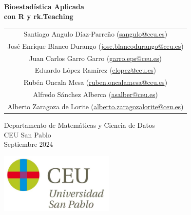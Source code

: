 \begin{titlepage}
\thispagestyle{empty}
\vspace*{7cm}
\par

\begin{center}
\normalfont\fontsize{30}{30}\selectfont
{\bfseries \color{blueceu}Bioestadística Aplicada\\ con R y rk.Teaching}
\end{center}
\vspace{1cm}

\begin{center}
\Large
\begin{tabular}{c}
Santiago Angulo Díaz-Parreño (\url{sangulo@ceu.es})\\
José Enrique Blanco Durango (\url{jose.blancodurango@ceu.es})\\
Juan Carlos Garro Garro (\url{garro.eps@ceu.es})\\
Eduardo López Ramírez (\url{elopez@ceu.es})\\
Rubén Oncala Mesa (\url{ruben.oncalamesa@ceu.es})\\
Alfredo Sánchez Alberca (\url{asalber@ceu.es})\\
Alberto Zaragoza de Lorite (\url{alberto.zaragozalorite@ceu.es})    
\end{tabular}

\medskip 
Departamento de Matemáticas y Ciencia de Datos\\ CEU San Pablo\\[1cm]
\medskip 
Septiembre 2024

\vspace{1cm}
\includegraphics[height=3cm]{img/logo_uspceu}
\end{center}
\vfill
\end{titlepage}